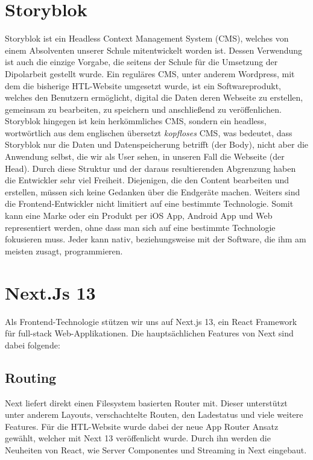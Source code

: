 \section{Storyblok}

Storyblok ist ein Headless Context Management System (CMS), welches von einem Absolventen unserer Schule mitentwickelt worden ist.
Dessen Verwendung ist auch die einzige Vorgabe, die seitens der Schule für die Umsetzung der Dipolarbeit gestellt wurde. 
Ein reguläres CMS, unter anderem Wordpress, mit dem die bisherige HTL-Website umgesetzt wurde, ist ein Softwareprodukt, 
welches den Benutzern ermöglicht, digital die Daten deren Webseite zu erstellen, gemeinsam zu bearbeiten, zu speichern 
und anschließend zu veröffenlichen.
Storyblok hingegen ist kein herkömmliches CMS, sondern ein headless, wortwörtlich aus dem englischen übersetzt \emph{kopfloses} CMS, 
was bedeutet, dass Storyblok nur die Daten und Datenspeicherung betrifft (der Body), nicht aber die Anwendung selbst, die wir als User sehen, in unseren Fall die Webseite (der Head).
Durch diese Struktur und der daraus resultierenden Abgrenzung haben die Entwickler sehr viel Freiheit. Diejenigen, die den Content bearbeiten und erstellen, müssen sich keine Gedanken über die Endgeräte machen.
Weiters sind die Frontend-Entwickler nicht limitiert auf eine bestimmte Technologie. Somit kann eine Marke oder ein Produkt per iOS App, Android App und Web representiert werden, ohne 
dass man sich auf eine bestimmte Technologie fokusieren muss. Jeder kann nativ, beziehungsweise mit der Software, die ihm am meisten zusagt, programmieren. \cite{storyblok}
\section{Next.Js 13}
Als Frontend-Technologie stützen wir uns auf Next.js 13, ein React Framework für full-stack Web-Applikationen. \cite{nextjsdocs}
Die hauptsächlichen Features von Next sind dabei folgende:

\subsection{Routing}
Next liefert direkt einen Filesystem basierten Router mit. Dieser unterstützt unter anderem Layouts, verschachtelte Routen, den Ladestatus und viele weitere Features.
Für die HTL-Website wurde dabei der neue App Router Ansatz gewählt, welcher mit Next 13 veröffenlicht wurde. Durch ihn werden die Neuheiten von React, wie Server Componentes und Streaming in Next eingebaut. \cite{nextjsdocsrouting}


